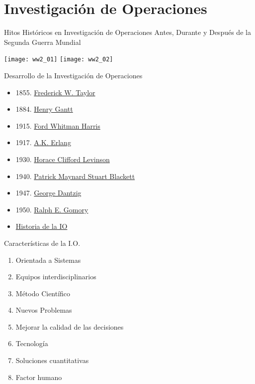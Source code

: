 \section{Investigación de Operaciones}
\label{sec:operations-research}

\begin{frame}{Hitos Históricos en Investigación de Operaciones}
  Antes, Durante y Después de la Segunda Guerra Mundial

  {\centering
    \texttt{[image: ww2\_01]}
    \texttt{[image: ww2\_02]}
  \par}
\end{frame}

\begin{frame}{Desarrollo de la Investigación de Operaciones}
 \label{slide:or-dates}
  \begin{itemize} \justifying \parskip3mm
  \item<only@1> 1855. \href{https://en.wikipedia.org/wiki/Frederick_Winslow_Taylor}{Frederick W. Taylor}
  \item<only@1> 1884.  \href{https://en.wikipedia.org/wiki/Henry_Gantt}{Henry Gantt}
  \item<only@1> 1915. \href{https://en.wikipedia.org/wiki/Ford_Whitman_Harris}{Ford Whitman Harris}
  \item<only@1> 1917. \href{https://en.wikipedia.org/wiki/Agner_Krarup_Erlang}{A.K. Erlang}
  \item<only@1> 1930. \href{https://en.wikipedia.org/wiki/Horace_Clifford_Levinson}{Horace Clifford Levinson}
  \item<only@2> 1940. \href{https://www.informs.org/Explore/History-of-O.R.-Excellence/Biographical-Profiles/Blackett-Patrick-M.-S}{Patrick Maynard Stuart Blackett}  
    \item<only@2> 1947. \href{https://en.wikipedia.org/wiki/George_Dantzig}{George Dantzig}
    \item<only@2> 1950. \href{https://en.wikipedia.org/wiki/Ralph_E._Gomory}{Ralph E. Gomory}
  \item<only@2> \href{https://www.youtube.com/watch?v=ILWbaWrjgU4}{Historia de la IO} 
  \end{itemize}
\end{frame}


\begin{frame}{Características de la I.O.}
  \begin{enumerate} \justifying \parskip3mm
  \item Orientada a Sistemas
  \item Equipos interdisciplinarios
  \item Método Científico
  \item Nuevos Problemas
  \item Mejorar la calidad de las decisiones
  \item Tecnología
  \item Soluciones cuantitativas
  \item Factor humano
  \end{enumerate}
\end{frame}

